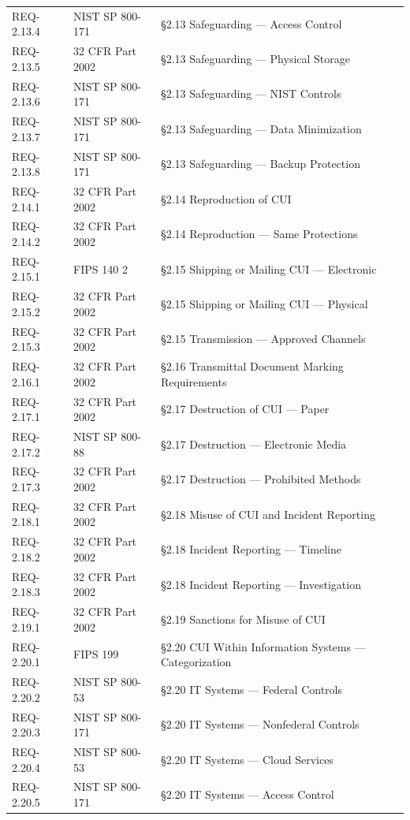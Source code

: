 \documentclass[11pt,letterpaper]{article}
\begin{document}
\begin{longtable}{@{}l l p{8cm}@{}}
REQ-2.13.4 & NIST SP 800-171 & \S2.13 Safeguarding --- Access Control \\
REQ-2.13.5 & 32 CFR Part 2002 & \S2.13 Safeguarding --- Physical Storage \\
REQ-2.13.6 & NIST SP 800-171 & \S2.13 Safeguarding --- NIST Controls \\
REQ-2.13.7 & NIST SP 800-171 & \S2.13 Safeguarding --- Data Minimization \\
REQ-2.13.8 & NIST SP 800-171 & \S2.13 Safeguarding --- Backup Protection \\
REQ-2.14.1 & 32 CFR Part 2002 & \S2.14 Reproduction of CUI \\
REQ-2.14.2 & 32 CFR Part 2002 & \S2.14 Reproduction --- Same Protections \\
REQ-2.15.1 & FIPS 140 2 & \S2.15 Shipping or Mailing CUI --- Electronic \\
REQ-2.15.2 & 32 CFR Part 2002 & \S2.15 Shipping or Mailing CUI --- Physical \\
REQ-2.15.3 & 32 CFR Part 2002 & \S2.15 Transmission --- Approved Channels \\
REQ-2.16.1 & 32 CFR Part 2002 & \S2.16 Transmittal Document Marking Requirements \\
REQ-2.17.1 & 32 CFR Part 2002 & \S2.17 Destruction of CUI --- Paper \\
REQ-2.17.2 & NIST SP 800-88 & \S2.17 Destruction --- Electronic Media \\
REQ-2.17.3 & 32 CFR Part 2002 & \S2.17 Destruction --- Prohibited Methods \\
REQ-2.18.1 & 32 CFR Part 2002 & \S2.18 Misuse of CUI and Incident Reporting \\
REQ-2.18.2 & 32 CFR Part 2002 & \S2.18 Incident Reporting --- Timeline \\
REQ-2.18.3 & 32 CFR Part 2002 & \S2.18 Incident Reporting --- Investigation \\
REQ-2.19.1 & 32 CFR Part 2002 & \S2.19 Sanctions for Misuse of CUI \\
REQ-2.20.1 & FIPS 199 & \S2.20 CUI Within Information Systems --- Categorization \\
REQ-2.20.2 & NIST SP 800-53 & \S2.20 IT Systems --- Federal Controls \\
REQ-2.20.3 & NIST SP 800-171 & \S2.20 IT Systems --- Nonfederal Controls \\
REQ-2.20.4 & NIST SP 800-53 & \S2.20 IT Systems --- Cloud Services \\
REQ-2.20.5 & NIST SP 800-171 & \S2.20 IT Systems --- Access Control \\

\end{longtable}
\end{document}
